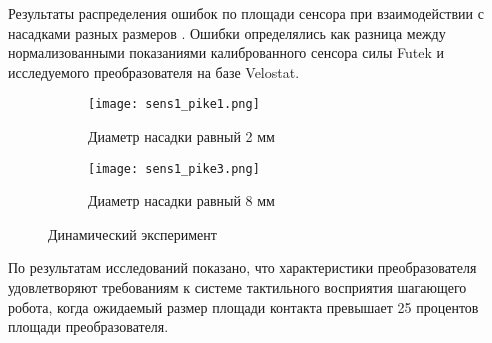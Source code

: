 Результаты распределения ошибок по площади сенсора при взаимодействии с насадками разных размеров . Ошибки определялись как разница между нормализованными показаниями калиброванного сенсора силы Futek и исследуемого преобразователя на базе Velostat.

\begin{figure}[H]
    \begin{subfigure}{0.49\textwidth}
        \centering\texttt{[image: sens1\_pike1.png]}
        \caption{Диаметр насадки равный 2 мм }
        \label{fig:sens1_pike1}
    \end{subfigure}
    \begin{subfigure}{0.49\textwidth}
        \centering\texttt{[image: sens1\_pike3.png]}
        \caption{Диаметр насадки равный 8 мм }
        \label{fig:sens1_pike3}
    \end{subfigure}
    \caption{Динамический эксперимент}
    \label{fig:dynamics_exp}
\end{figure}

По результатам исследований показано, что характеристики преобразователя удовлетворяют требованиям к системе тактильного восприятия шагающего робота, когда ожидаемый размер площади контакта превышает 25 процентов площади преобразователя.